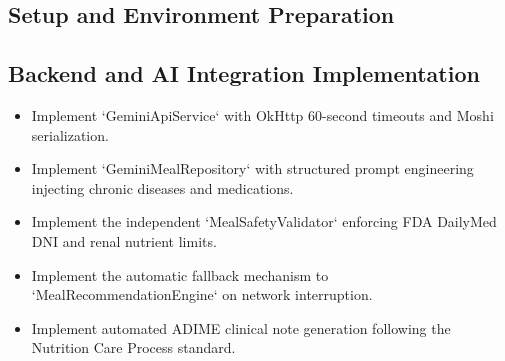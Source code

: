 \documentclass[a4paper,12pt]{report}
\begin{document}
\subsection{Setup and Environment Preparation}

\subsection{Backend and AI Integration Implementation}
\begin{itemize}
    \item Implement `GeminiApiService` with OkHttp 60-second timeouts and Moshi serialization.
    \item Implement `GeminiMealRepository` with structured prompt engineering injecting chronic diseases and medications.
    \item Implement the independent `MealSafetyValidator` enforcing FDA DailyMed DNI and renal nutrient limits.
    \item Implement the automatic fallback mechanism to `MealRecommendationEngine` on network interruption.
    \item Implement automated ADIME clinical note generation following the Nutrition Care Process standard.
\end{itemize}
\end{document}
